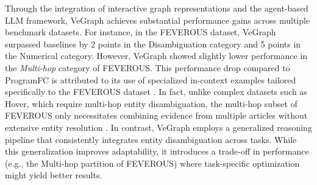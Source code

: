 \documentclass[11pt]{article}
\begin{document}
Through the integration of interactive graph representations and the agent-based LLM framework, VeGraph achieves substantial performance gains across multiple benchmark datasets. For instance, in the FEVEROUS dataset, VeGraph surpassed baselines by 2 points in the Disambiguation category and 5 points in the Numerical category. However, VeGraph showed slightly lower performance in the \textit{Multi-hop} category of FEVEROUS. This performance drop compared to ProgramFC is attributed to its use of specialized in-context examples tailored specifically to the FEVEROUS dataset \cite{program_fc}. In fact, unlike complex datasets such as Hover, which require multi-hop entity disambiguation, the multi-hop subset of FEVEROUS only necessitates combining evidence from multiple articles without extensive entity resolution \cite{feverous_dataset}. In contrast, VeGraph employs a generalized reasoning pipeline that consistently integrates entity disambiguation across tasks. While this generalization improves adaptability, it introduces a trade-off in performance (e.g., the Multi-hop partition of FEVEROUS) where task-specific optimization might yield better results. 
\end{document}
